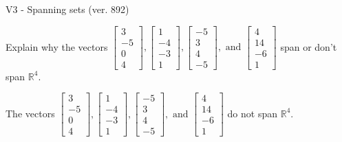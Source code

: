 \begin{exercise}
  \begin{exerciseTitle}V3 - Spanning sets (ver. 892)\end{exerciseTitle}
  \begin{exerciseStatement}
    Explain why the vectors \(\left[\begin{array}{r}
3 \\
-5 \\
0 \\
4
\end{array}\right] , \left[\begin{array}{r}
1 \\
-4 \\
-3 \\
1
\end{array}\right] , \left[\begin{array}{r}
-5 \\
3 \\
4 \\
-5
\end{array}\right] , \text{ and } \left[\begin{array}{r}
4 \\
14 \\
-6 \\
1
\end{array}\right]\) span or don't span \(\mathbb{R}^4\). 
	


  \end{exerciseStatement}
  \begin{exerciseAnswer}
   The vectors \(\left[\begin{array}{r}
3 \\
-5 \\
0 \\
4
\end{array}\right] , \left[\begin{array}{r}
1 \\
-4 \\
-3 \\
1
\end{array}\right] , \left[\begin{array}{r}
-5 \\
3 \\
4 \\
-5
\end{array}\right] , \text{ and } \left[\begin{array}{r}
4 \\
14 \\
-6 \\
1
\end{array}\right]\) 
  	 do not  
	span \(\mathbb{R}^4\).
  


  \end{exerciseAnswer}
\end{exercise}